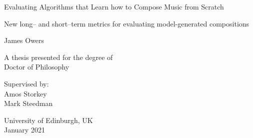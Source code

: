 \documentclass[12pt,a4paper,]{report}
\begin{document}
\begin{titlepage}
    \begin{center}


        \vspace*{2.5cm}

        \huge
        Evaluating Algorithms that Learn how to Compose Music from
        Scratch

                \vspace{.5cm}

        \Large
        New long-- and short--term metrics for evaluating
        model-generated compositions
        

        \vspace{1.5cm}

        \Large
        James Owers

        \vspace{1.5cm}

        \normalsize
        A thesis presented for the degree of\\
        Doctor of Philosophy

        \vfill

        \normalsize
        Supervised by:\\
        Amos Storkey \\ Mark Steedman

        \vspace{0.8cm}


        \normalsize
        University of Edinburgh, UK\\
        January 2021


    \end{center}
\end{titlepage}


\vspace*{\fill}
\end{document}
